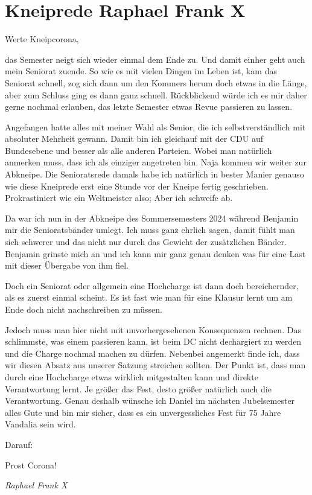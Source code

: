 \section{Kneiprede Raphael Frank X}

\begin{multicols}{2}


Werte Kneipcorona,



das Semester neigt sich
wieder einmal dem Ende zu. Und damit einher geht auch mein Seniorat zuende. So
wie es mit vielen Dingen im Leben ist, kam das Seniorat schnell, zog sich dann
um den Kommers herum doch etwas in die Länge, aber zum Schluss ging es dann
ganz schnell. Rückblickend würde ich es mir daher gerne nochmal erlauben, das
letzte Semester etwas Revue passieren zu lassen.



Angefangen hatte alles mit
meiner Wahl als Senior, die ich selbstverständlich mit absoluter Mehrheit
gewann. Damit bin ich gleichauf mit der CDU auf Bundesebene und besser als alle
anderen Parteien. Wobei man natürlich anmerken muss, dass ich als einziger
angetreten bin. Naja kommen wir weiter zur Abkneipe. Die Senioratsrede damals
habe ich natürlich in bester Manier genauso wie diese Kneiprede erst eine
Stunde vor der Kneipe fertig geschrieben. Prokrastiniert wie ein Weltmeister
also; Aber
ich schweife ab.



Da war ich nun in der
Abkneipe des Sommersemesters 2024 während Benjamin mir die Senioratsbänder
umlegt. Ich muss ganz ehrlich sagen, damit fühlt man sich schwerer und das
nicht nur durch das Gewicht der zusätzlichen Bänder. Benjamin grinste mich an
und ich kann mir ganz genau denken was für eine Last mit dieser Übergabe von
ihm fiel.



Doch ein Seniorat oder
allgemein eine Hochcharge ist dann doch bereichernder, als es zuerst einmal
scheint. Es ist fast wie man für eine Klausur lernt um am Ende doch nicht
nachschreiben zu müssen.



Jedoch muss man hier nicht
mit unvorhergesehenen Konsequenzen rechnen. Das schlimmste, was einem passieren
kann, ist beim DC nicht dechargiert zu werden und die Charge nochmal machen zu
dürfen. Nebenbei angemerkt finde ich, dass wir diesen Absatz aus unserer
Satzung streichen sollten. Der Punkt ist, dass man durch eine Hochcharge etwas
wirklich mitgestalten kann und direkte Verantwortung lernt. Je größer das Fest,
desto größer natürlich auch die Verantwortung. Genau deshalb wünsche ich Daniel
im nächsten Jubelsemester alles Gute und bin mir sicher, dass es ein
unvergessliches Fest für 75 Jahre Vandalia sein wird.



Darauf:



Prost Corona!





	\begin{flushright}
		\hfill\emph{Raphael Frank X}
	\end{flushright}
\end{multicols}